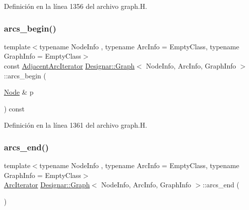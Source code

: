 Definición en la línea 1356 del archivo graph.\+H.

\mbox{\label{class_designar_1_1_graph_a2c527f6bddb0ff454fd6139f2437c27b}} 
\subsubsection{\texorpdfstring{arcs\+\_\+begin()}{arcs\_begin()}\hspace{0.1cm}{\footnotesize\ttfamily [4/4]}}
{\footnotesize\ttfamily template$<$typename Node\+Info , typename Arc\+Info  = Empty\+Class, typename Graph\+Info  = Empty\+Class$>$ \\
const \hyperlink{class_designar_1_1_graph_1_1_adjacent_arc_iterator}{Adjacent\+Arc\+Iterator} \hyperlink{class_designar_1_1_graph}{Designar\+::\+Graph}$<$ Node\+Info, Arc\+Info, Graph\+Info $>$\+::arcs\+\_\+begin (\begin{DoxyParamCaption}\item[{\hyperlink{class_designar_1_1_graph_a5dfc7dba9d092ac489c72e40390c37d0}{Node} \&}]{p }\end{DoxyParamCaption}) const\hspace{0.3cm}{\ttfamily [inline]}}



Definición en la línea 1361 del archivo graph.\+H.

\mbox{\label{class_designar_1_1_graph_a57a43c94f28df5958e912554d640bdaa}} 
\subsubsection{\texorpdfstring{arcs\+\_\+end()}{arcs\_end()}\hspace{0.1cm}{\footnotesize\ttfamily [1/4]}}
{\footnotesize\ttfamily template$<$typename Node\+Info , typename Arc\+Info  = Empty\+Class, typename Graph\+Info  = Empty\+Class$>$ \\
\hyperlink{class_designar_1_1_graph_1_1_arc_iterator}{Arc\+Iterator} \hyperlink{class_designar_1_1_graph}{Designar\+::\+Graph}$<$ Node\+Info, Arc\+Info, Graph\+Info $>$\+::arcs\+\_\+end (\begin{DoxyParamCaption}{ }\end{DoxyParamCaption})\hspace{0.3cm}{\ttfamily [inline]}}



